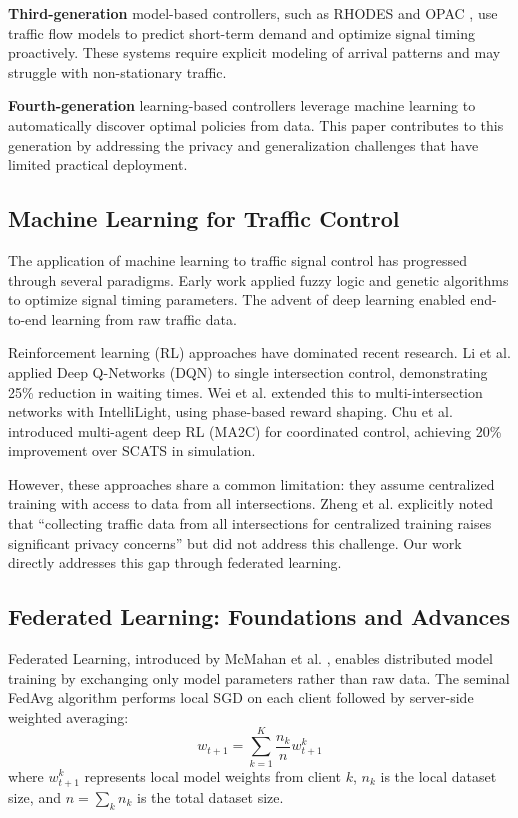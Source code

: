 \documentclass[conference]{IEEEtran}
\begin{document}
\textbf{Third-generation} model-based controllers, such as RHODES \cite{mirchandani2001rhodes} and OPAC \cite{gartner1983opac}, use traffic flow models to predict short-term demand and optimize signal timing proactively. These systems require explicit modeling of arrival patterns and may struggle with non-stationary traffic.

\textbf{Fourth-generation} learning-based controllers leverage machine learning to automatically discover optimal policies from data. This paper contributes to this generation by addressing the privacy and generalization challenges that have limited practical deployment.

\subsection{Machine Learning for Traffic Control}
The application of machine learning to traffic signal control has progressed through several paradigms. Early work applied fuzzy logic \cite{pappis1977fuzzy} and genetic algorithms \cite{ceylan2004genetic} to optimize signal timing parameters. The advent of deep learning enabled end-to-end learning from raw traffic data.

Reinforcement learning (RL) approaches have dominated recent research. Li et al. \cite{li2016traffic} applied Deep Q-Networks (DQN) to single intersection control, demonstrating 25\% reduction in waiting times. Wei et al. \cite{wei2018intellilight} extended this to multi-intersection networks with IntelliLight, using phase-based reward shaping. Chu et al. \cite{chu2019multi} introduced multi-agent deep RL (MA2C) for coordinated control, achieving 20\% improvement over SCATS in simulation.

However, these approaches share a common limitation: they assume centralized training with access to data from all intersections. Zheng et al. \cite{zheng2019learning} explicitly noted that ``collecting traffic data from all intersections for centralized training raises significant privacy concerns'' but did not address this challenge. Our work directly addresses this gap through federated learning.

\subsection{Federated Learning: Foundations and Advances}
Federated Learning, introduced by McMahan et al. \cite{mcmahan2017fedavg}, enables distributed model training by exchanging only model parameters rather than raw data. The seminal FedAvg algorithm performs local SGD on each client followed by server-side weighted averaging:
\begin{equation}
w_{t+1} = \sum_{k=1}^{K} \frac{n_k}{n} w_{t+1}^k
\end{equation}
where $w_{t+1}^k$ represents local model weights from client $k$, $n_k$ is the local dataset size, and $n = \sum_k n_k$ is the total dataset size.
\end{document}
